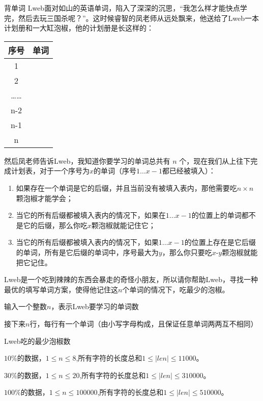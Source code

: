 \begin{problem}{背单词}
Lweb面对如山的英语单词，陷入了深深的沉思，“我怎么样才能快点学完，然后去玩三国杀呢？”。这时候睿智的凤老师从远处飘来，他送给了Lweb一本计划册和一大缸泡椒，他的计划册是长这样的：

\begin{table}[htbp]
    \begin{tabular}{cc}
    \toprule
    序号    & 单词 \\
    \midrule
    1     &  \\
    2     &  \\
    ……    &  \\
    n-2   &  \\
    n-1   &  \\
    n     &  \\
    \bottomrule
    \end{tabular}%
\end{table}%

然后凤老师告诉Lweb，我知道你要学习的单词总共有 $n$ 个，现在我们从上往下完成计划表，对于一个序号为$x$的单词（序号$1\dots x-1$都已经被填入）：

\begin{enumerate}[1)]
\item 如果存在一个单词是它的后缀，并且当前没有被填入表内，那他需要吃$n\times n$颗泡椒才能学会；
\item 当它的所有后缀都被填入表内的情况下，如果在$1\dots x-1$的位置上的单词都不是它的后缀，那么你吃$x$颗泡椒就能记住它；
\item 当它的所有后缀都被填入表内的情况下，如果$1\dots x-1$的位置上存在是它后缀的单词，所有是它后缀的单词中，序号最大为$y$，那么你只要吃$x$-$y$颗泡椒就能把它记住。
\end{enumerate}

Lweb是一个吃到辣辣的东西会暴走的奇怪小朋友，所以请你帮助Lweb，寻找一种最优的填写单词方案，使得他记住这$n$个单词的情况下，吃最少的泡椒。

\InputFile
输入一个整数$n$，表示Lweb要学习的单词数

接下来$n$行，每行有一个单词（由小写字母构成，且保证任意单词两两互不相同）

\OutputFile
Lweb吃的最少泡椒数

\Example
\begin{example}
%
\end{example}

\Note
$10\%$的数据，$1\le n \le 8$,所有字符的长度总和$1\le |len|\le 11000$。

$30\%$的数据，$1\le n\le 20$,所有字符的长度总和$1\le |len|\le 310000$。

$100\%$的数据，$1\le n\le 100000$,所有字符的长度总和$1\le |len|\le 510000$。
\end{problem}
